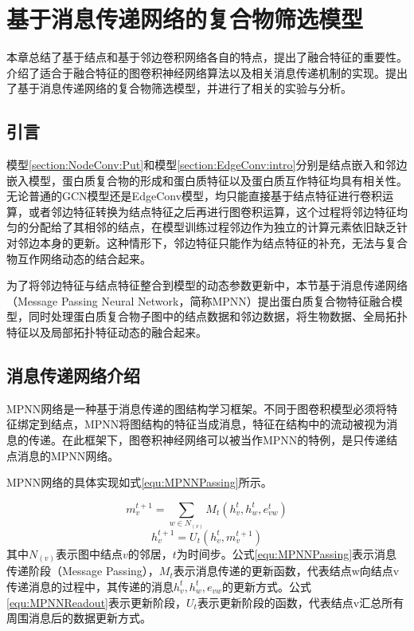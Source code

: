 \chapter{基于消息传递网络的复合物筛选模型}
\label{chapter:MPNN}

本章总结了基于结点和基于邻边卷积网络各自的特点，提出了融合特征的重要性。介绍了适合于融合特征的图卷积神经网络算法以及相关消息传递机制的实现。提出了基于消息传递网络的复合物筛选模型，并进行了相关的实验与分析。

\section{引言}
\label{section:MPNN:Put}

模型\ref{section:NodeConv:Put}和模型\ref{section:EdgeConv:intro}分别是结点嵌入和邻边嵌入模型，蛋白质复合物的形成和蛋白质特征以及蛋白质互作特征均具有相关性。
无论普通的GCN模型还是EdgeConv模型，均只能直接基于结点特征进行卷积运算，或者邻边特征转换为结点特征之后再进行图卷积运算，这个过程将邻边特征均匀的分配给了其相邻的结点，在模型训练过程邻边作为独立的计算元素依旧缺乏针对邻边本身的更新。这种情形下，邻边特征只能作为结点特征的补充，无法与复合物互作网络动态的结合起来。

为了将邻边特征与结点特征整合到模型的动态参数更新中，本节基于消息传递网络（Message Passing Neural Network，简称MPNN）提出蛋白质复合物特征融合模型，同时处理蛋白质复合物子图中的结点数据和邻边数据，将生物数据、全局拓扑特征以及局部拓扑特征动态的融合起来。
\section{消息传递网络介绍}
\label{section:MPNN:intro}

MPNN网络\cite{gilmer_neural_2017}是一种基于消息传递的图结构学习框架。不同于图卷积模型必须将特征绑定到结点，MPNN将图结构的特征当成消息，特征在结构中的流动被视为消息的传递。在此框架下，图卷积神经网络可以被当作MPNN的特例，是只传递结点消息的MPNN网络。


MPNN网络的具体实现如式\ref{equ:MPNNPassing}所示。

\begin{equation}
    \label{equ:MPNNPassing}
    m_v^{t+1} = \sum_{w \in N_{(v)}}M_t(h_v^t,h_w^t,e_{vw}^t)
\end{equation}
\begin{equation}
    \label{equ:MPNNReadout}
    h_v^{t+1} = U_t(h_v^t,m_v^{t+1})
\end{equation}
其中$N_{(v)}$表示图中结点$v$的邻居，$t$为时间步。公式\ref{equ:MPNNPassing}表示消息传递阶段（Message Passing），$M_t$表示消息传递的更新函数，代表结点w向结点v传递消息的过程中，其传递的消息$h_v^t,h_w^t,e_{vw}$的更新方式。公式\ref{equ:MPNNReadout}表示更新阶段，$U_t$表示更新阶段的函数，代表结点v汇总所有周围消息后的数据更新方式。


